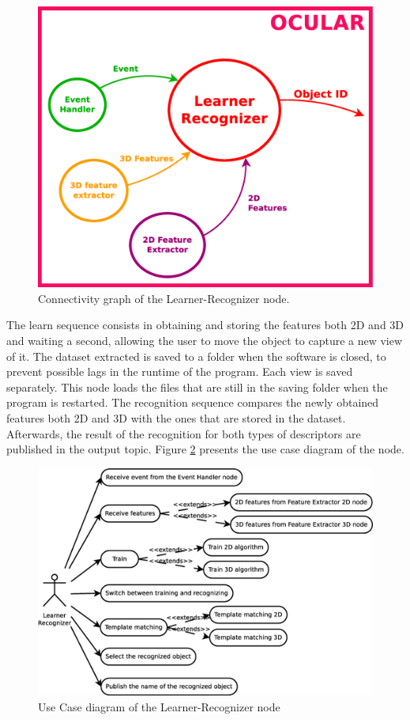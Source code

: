 	\vspace{0.5cm}
	\begin{figure}[H]
			\begin{center}
			\includegraphics[width=0.5\linewidth]{img/diagrams/node_lr.eps}
			\caption[Learner-Recognizer node I/O]{Connectivity graph of the Learner-Recognizer node.}		
			\end{center}
						\label{node_lr}

		\end{figure}
\vspace{0.5cm}


	The learn sequence consists in obtaining and storing the features both 2D and 3D and waiting a second, allowing the user to move the object to capture a new view of it. 
	The dataset extracted is saved to a folder when the software is closed, to prevent possible lags in the runtime of the program. 
	Each view is saved separately. 
	This node loads the files that are still in the saving folder when the program is restarted. 
	The recognition sequence compares the newly obtained features both 2D and 3D with the ones that are stored in the dataset. 
	Afterwards, the result of the recognition for both types of descriptors are published in the output topic. 
	Figure \ref{uc_learner_recognizer} presents the use case diagram of the node. 

	\begin{figure}[H]
		\centering
			\includegraphics[scale=0.4]{img/diagrams/uc_learner_recognizer.eps}
			\caption[Use case diagram Learner-Recognizer node]{Use Case diagram of the Learner-Recognizer node}
			\label{uc_learner_recognizer}
	\end{figure}

